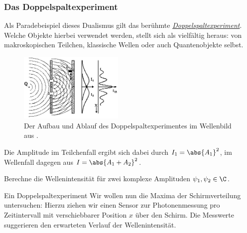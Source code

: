 \documentclass{subfiles}
\begin{document}
    \subsubsection*{Das Doppelspaltexperiment}
        Als Paradebeispiel dieses Dualismus gilt das berühmte \href{https://de.wikipedia.org/wiki/Doppelspaltexperiment}{\emph{Doppelspaltexperiment}}. Welche Objekte hierbei verwendet werden, stellt sich als vielfältig heraus: von makroskopischen Teilchen, klassische Wellen oder auch Quantenobjekte selbst. 
        \begin{figure}[H]
            \centering
            \includegraphics[width=5cm]{Bilddateien/Doppelspalt.png}
            \caption{Der Aufbau und Ablauf des Doppelspaltexperimentes im Wellenbild aus \cite{tubs:Doppelspalt}.}
        \end{figure}
        Die Amplitude im Teilchenfall ergibt sich dabei durch $I_1 = \abs{A_1}^2$, im Wellenfall dagegen aus $I = \abs{A_1+A_2}^2$. 
        \begin{Aufgabe}
            \nr{} Berechne die Wellenintensität für zwei komplexe Amplituden $\psi_1,\psi_2\in\C$. 
        \end{Aufgabe}
        \begin{Experiment}{Ein Doppelspaltexperiment}
            \label{Ub:Doppelspaltexperiment}
            Wir wollen nun die Maxima der Schirmverteilung untersuchen: Hierzu ziehen wir einen Sensor zur Photonenmessung pro Zeitintervall mit verschiebbarer Position $x$ über den Schirm. Die Messwerte suggerieren den erwarteten Verlauf der Wellenintensität.
        \end{Experiment}

    
\end{document}
